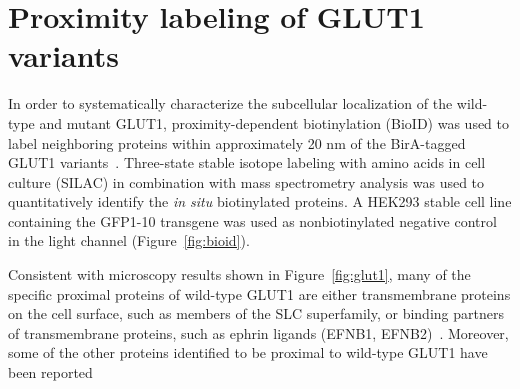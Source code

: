 \section{Proximity labeling of GLUT1 variants}
In order to systematically characterize the subcellular localization of the wild-type and mutant GLUT1, proximity-dependent biotinylation (BioID) was used to label neighboring proteins within approximately 20 nm of the BirA-tagged GLUT1 variants~\cite{Kim,Dong}. Three-state stable isotope labeling with amino acids in cell culture (SILAC) in combination with mass spectrometry analysis was used to quantitatively identify the \textit{in situ} biotinylated proteins. A HEK293 stable cell line containing the GFP1-10 transgene was used as nonbiotinylated negative control in the light channel (Figure~\ref{fig:bioid}). 

Consistent with microscopy results shown in Figure~\ref{fig:glut1}, many of the specific proximal proteins of wild-type GLUT1 are either transmembrane proteins on the cell surface, such as members of the SLC superfamily, or binding partners of transmembrane proteins, such as ephrin ligands (EFNB1, EFNB2)~\cite{He,Himanen}. Moreover, some of the other proteins identified to be proximal to wild-type GLUT1 have been reported

